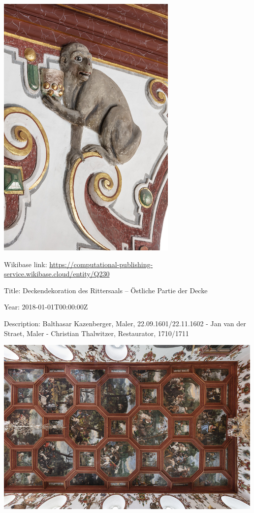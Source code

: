 \documentclass[
  letterpaper,
]{book}
\begin{document}
\includegraphics{paintings_files/figure-pdf/cell-3-output-68.png}

Wikibase link:
\url{https://computational-publishing-service.wikibase.cloud/entity/Q230}

Title: Deckendekoration des Rittersaals -- Östliche Partie der Decke

Year: 2018-01-01T00:00:00Z

Description: Balthasar Kazenberger, Maler, 22.09.1601/22.11.1602 - Jan
van der Straet, Maler - Christian Thalwitzer, Restaurator, 1710/1711

\includegraphics{paintings_files/figure-pdf/cell-3-output-70.png}
\end{document}
